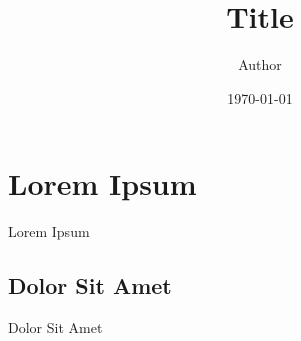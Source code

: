 \documentclass{amsart}
\title{Title}
\author{Author}
\date{\today}
\begin{document}
\maketitle
\tableofcontents
\section{Lorem Ipsum}
Lorem Ipsum
\subsection{Dolor Sit Amet}
Dolor Sit Amet
\end{document}
